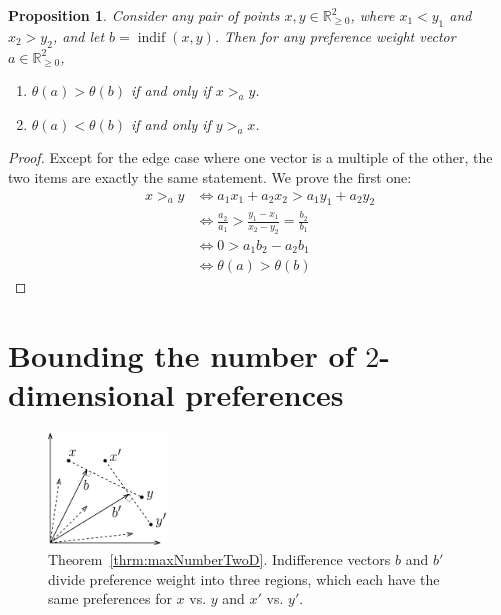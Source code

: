 \documentclass[12pt]{article}
\newtheorem{proposition}[theorem]{Proposition}
\newcommand{\R}{\mathbb{R}}
\newcommand{\Rgz}{\mathbb{R}_{\ge 0}}
\DeclareMathOperator*{\cone}{cone}
\DeclareMathOperator*{\indif}{indif}
\newcommand{\1}[1]{\mathds{1}[{#1}]}
\begin{document}
    \begin{proposition} \label{prop:compEqualizerAngle}
      Consider any pair of points $x, y \in \Rgz^2$, 
      where $x_1 < y_1$ and $x_2 > y_2$, 
      and let $b = \indif(x,y)$.
      Then for any preference weight vector $a \in \R_{\geq 0}^2$,
      \begin{enumerate}
        \item \label{clm:angle1} $\theta(a) > \theta(b)$ if and only if $x >_a y$.
        \item \label{clm:angle2} $\theta(a) < \theta(b)$ if and only if $y >_a x$.
      \end{enumerate}
    \end{proposition}
    \begin{proof}
      Except for the edge case where one vector is a
      multiple of the other, the two items are exactly the same statement.
      We prove the first one:
      \begin{align*}
        x >_a y
        & \iff a_1 x_1 + a_2 x_2 > a_1 y_1 + a_2 y_2
        \\ & \iff \frac{a_2}{a_1} > \frac{y_1 - x_1}{x_2 - y_2} 
          = \frac{b_2}{b_1}
        \\ & \iff 0 > a_1 b_2 - a_2 b_1
        \\ & \iff \theta(a) > \theta(b)
      \end{align*}
    \end{proof}


\clearpage %
\section{Bounding the number of $2$-dimensional preferences}

  \begin{figure}
    \begin{center}
      \includegraphics[width=0.28\textwidth]{figures/lemSlopes}
    \end{center}
    \caption{
      Theorem~\ref{thrm:maxNumberTwoD}.
      Indifference vectors $b$ and $b'$ divide preference weight into three
      regions, which each have the same preferences for $x$ vs. $y$
      and $x'$ vs. $y'$.
    }
  \end{figure}
\end{document}
